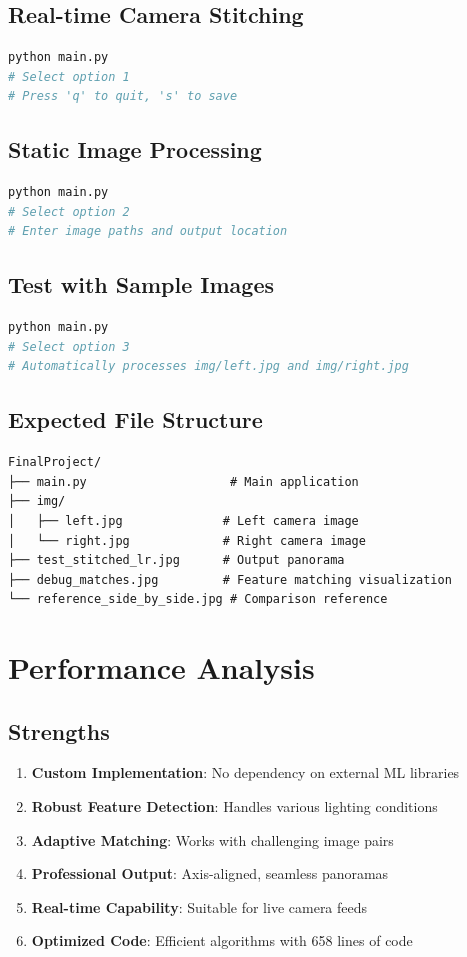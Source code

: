 \documentclass[12pt,a4paper]{article}
\begin{document}
\subsection{Real-time Camera Stitching}
\begin{lstlisting}[language=bash]
python main.py
# Select option 1
# Press 'q' to quit, 's' to save
\end{lstlisting}

\subsection{Static Image Processing}
\begin{lstlisting}[language=bash]
python main.py
# Select option 2
# Enter image paths and output location
\end{lstlisting}

\subsection{Test with Sample Images}
\begin{lstlisting}[language=bash]
python main.py
# Select option 3
# Automatically processes img/left.jpg and img/right.jpg
\end{lstlisting}

\subsection{Expected File Structure}
\begin{lstlisting}
FinalProject/
├── main.py                    # Main application
├── img/
│   ├── left.jpg              # Left camera image
│   └── right.jpg             # Right camera image
├── test_stitched_lr.jpg      # Output panorama
├── debug_matches.jpg         # Feature matching visualization
└── reference_side_by_side.jpg # Comparison reference
\end{lstlisting}

\section{Performance Analysis}

\subsection{Strengths}
\begin{enumerate}
    \item \textbf{Custom Implementation}: No dependency on external ML libraries
    \item \textbf{Robust Feature Detection}: Handles various lighting conditions
    \item \textbf{Adaptive Matching}: Works with challenging image pairs
    \item \textbf{Professional Output}: Axis-aligned, seamless panoramas
    \item \textbf{Real-time Capability}: Suitable for live camera feeds
    \item \textbf{Optimized Code}: Efficient algorithms with 658 lines of code
\end{enumerate}
\end{document}
